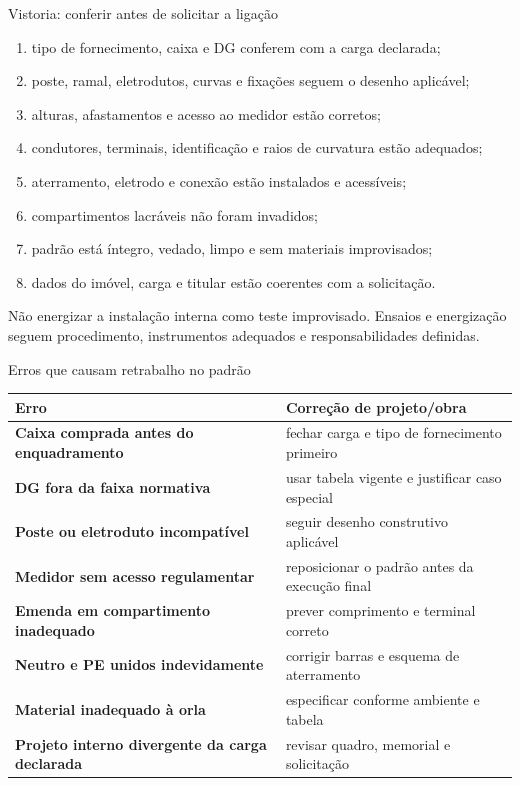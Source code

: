 \begin{frame}{Vistoria: conferir antes de solicitar a ligação}
\small
\begin{enumerate}
\item tipo de fornecimento, caixa e DG conferem com a carga declarada;
\item poste, ramal, eletrodutos, curvas e fixações seguem o desenho aplicável;
\item alturas, afastamentos e acesso ao medidor estão corretos;
\item condutores, terminais, identificação e raios de curvatura estão adequados;
\item aterramento, eletrodo e conexão estão instalados e acessíveis;
\item compartimentos lacráveis não foram invadidos;
\item padrão está íntegro, vedado, limpo e sem materiais improvisados;
\item dados do imóvel, carga e titular estão coerentes com a solicitação.
\end{enumerate}
\begin{caixaAt}
Não energizar a instalação interna como teste improvisado. Ensaios e energização seguem procedimento, instrumentos adequados e responsabilidades definidas.
\end{caixaAt}
\end{frame}

\begin{frame}{Erros que causam retrabalho no padrão}
\scriptsize
\begin{tabularx}{\textwidth}{>{\bfseries}p{3.4cm}X}
\toprule
Erro & Correção de projeto/obra \\
\midrule
Caixa comprada antes do enquadramento & fechar carga e tipo de fornecimento primeiro \\
DG fora da faixa normativa & usar tabela vigente e justificar caso especial \\
Poste ou eletroduto incompatível & seguir desenho construtivo aplicável \\
Medidor sem acesso regulamentar & reposicionar o padrão antes da execução final \\
Emenda em compartimento inadequado & prever comprimento e terminal correto \\
Neutro e PE unidos indevidamente & corrigir barras e esquema de aterramento \\
Material inadequado à orla & especificar conforme ambiente e tabela \\
Projeto interno divergente da carga declarada & revisar quadro, memorial e solicitação \\
\bottomrule
\end{tabularx}
\end{frame}
